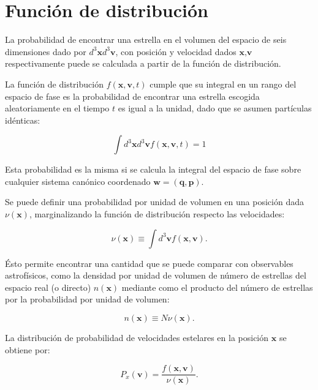 \section{Función de distribución}

La probabilidad de encontrar una estrella en el volumen del espacio de seis dimensiones dado por $d^3\textbf{x} d^3\textbf{v}$, con posición y velocidad dados $\textbf{x}, \textbf{v}$ respectivamente puede se calculada a partir de la función de distribución.

La función de distribución  $f (\textbf{x} ,\textbf{v}, t)$ cumple que su integral en un rango del espacio de fase es la probabilidad de encontrar una estrella escogida aleatoriamente en el tiempo $t$ es igual a la unidad, dado que se asumen partículas  idénticas:

$$ \int d^3\textbf{x} d^3\textbf{v} f (\textbf{x} ,\textbf{v}, t)  = 1 $$

Esta probabilidad es la misma si se calcula la integral del espacio de fase sobre cualquier sistema canónico coordenado $ \textbf{w} = (\textbf{q}, \textbf{p})$.

Se puede definir una probabilidad por unidad de volumen en una posición dada $\nu( \textbf{x} ) $, marginalizando la función de distribución respecto las velocidades:

\begin{equation}
\label{Dens_prob}
\nu( \textbf{x} ) \equiv \int d^3\textbf{v} f(\textbf{x}, \textbf{v}).
\end{equation}


Ésto permite encontrar una cantidad que se puede comparar con observables astrofísicos, como la densidad por unidad de volumen de número de estrellas del espacio real (o directo) $n ( \textbf{x} ) $ mediante como el producto del número de estrellas por la probabilidad por unidad de volumen:

$$ n ( \textbf{x} ) \equiv N \nu(\textbf{x} ). $$

La distribución de probabilidad de velocidades estelares en la posición $\textbf{x}$ se obtiene por:

\begin{equation}
\label{Prob_vel}
P_x(\textbf{v}) = \frac{f(\textbf{x}, \textbf{v})}{\nu(\textbf{x})}.
\end{equation}



